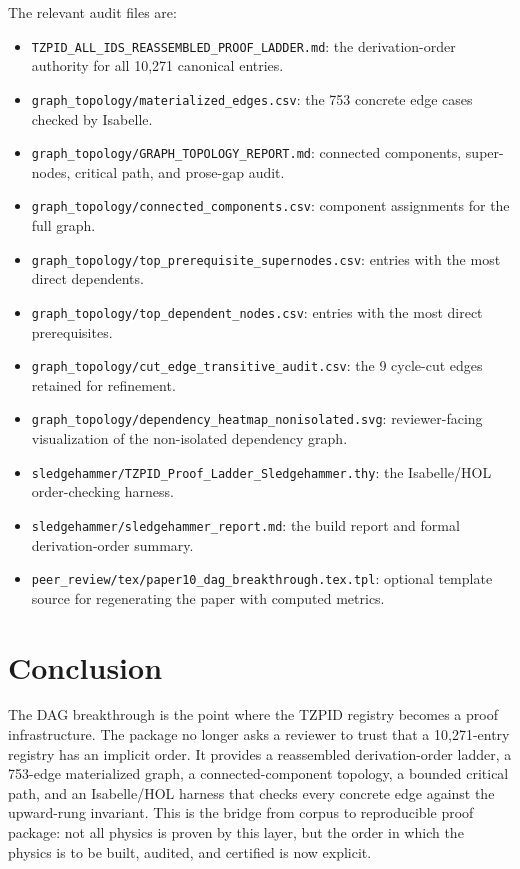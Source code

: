 \documentclass[11pt]{article}
\theoremstyle{remark}
\begin{document}
The relevant audit files are:

\begin{itemize}
  \item \texttt{TZPID\_ALL\_IDS\_REASSEMBLED\_PROOF\_LADDER.md}: the derivation-order authority for all 10,271 canonical entries.
  \item \texttt{graph\_topology/materialized\_edges.csv}: the 753 concrete edge cases checked by Isabelle.
  \item \texttt{graph\_topology/GRAPH\_TOPOLOGY\_REPORT.md}: connected components, super-nodes, critical path, and prose-gap audit.
  \item \texttt{graph\_topology/connected\_components.csv}: component assignments for the full graph.
  \item \texttt{graph\_topology/top\_prerequisite\_supernodes.csv}: entries with the most direct dependents.
  \item \texttt{graph\_topology/top\_dependent\_nodes.csv}: entries with the most direct prerequisites.
  \item \texttt{graph\_topology/cut\_edge\_transitive\_audit.csv}: the 9 cycle-cut edges retained for refinement.
  \item \texttt{graph\_topology/dependency\_heatmap\_nonisolated.svg}: reviewer-facing visualization of the non-isolated dependency graph.
  \item \texttt{sledgehammer/TZPID\_Proof\_Ladder\_Sledgehammer.thy}: the Isabelle/HOL order-checking harness.
  \item \texttt{sledgehammer/sledgehammer\_report.md}: the build report and formal derivation-order summary.
  \item \texttt{peer\_review/tex/paper10\_dag\_breakthrough.tex.tpl}: optional template source for regenerating the paper with computed metrics.
\end{itemize}

\section{Conclusion}
\label{sec:conclusion}

The DAG breakthrough is the point where the TZPID registry becomes a proof infrastructure. The package no longer asks a reviewer to trust that a 10,271-entry registry has an implicit order. It provides a reassembled derivation-order ladder, a 753-edge materialized graph, a connected-component topology, a bounded critical path, and an Isabelle/HOL harness that checks every concrete edge against the upward-rung invariant. This is the bridge from corpus to reproducible proof package: not all physics is proven by this layer, but the order in which the physics is to be built, audited, and certified is now explicit.
\end{document}
